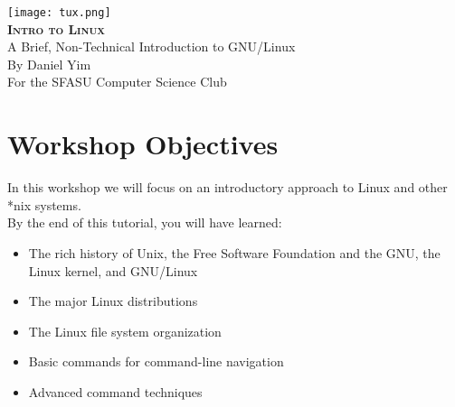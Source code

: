 \documentclass[11pt,oneside]{article}
\newcommand{\articleTitle}{Intro to Linux}
\newcommand{\subtitle}{A Brief, Non-Technical Introduction to GNU/Linux}
\newcommand{\articleAuthor}{By Daniel Yim}
\newcommand{\contact}{For the SFASU Computer Science Club}
\newcommand{\lastUpdated}{March 27, 2010}
\newcommand{\header}[5]{
	\begin{center}
        \texttt{[image: tux.png]}
        \\
        {\fontsize{32pt}{10pt}\selectfont\scshape\bf#1}\\
        \vspace{0.6ex}
        {\fontsize{14pt}{10pt}\selectfont#2}\\
        \vspace{2.0ex}
        #3\\
        #4\\
    \end{center}
    \vspace{2.0ex}
}
\newenvironment{articleSectionN}[1]
{#1}
{}
\begin{document}
\selectfont

\header{\articleTitle}{\subtitle}{\articleAuthor}{\contact}{\lastUpdated}
\vspace{2.0ex}

\section*{Workshop Objectives}
\begin{articleSectionN}
In this workshop we will focus on an introductory approach to Linux and other *nix systems.
\\

\noindent By the end of this tutorial, you will have learned:
\begin{itemize}
\item{The rich history of Unix, the Free Software Foundation and the GNU, the Linux kernel, and GNU/Linux}
\item{The major Linux distributions}
\item{The Linux file system organization}
\item{Basic commands for command-line navigation}
\item{Advanced command techniques}
\end{itemize}
\paragraph{}
\end{articleSectionN}
\end{document}
